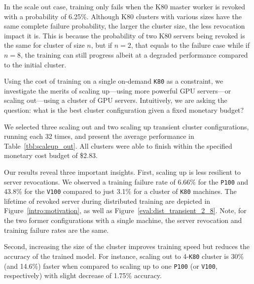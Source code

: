 \begin{table}[t]
{%
In the scale out case, training only fails when the K80 master worker is revoked with a probability of 6.25\%. Although K80 clusters with various sizes have the same complete failure probability, the larger the cluster size, the less revocation impact it is. This is because the probability of two K80 servers being revoked is the same for cluster of size $n$, but if $n=2$, that equals to the failure case while if $n=8$, the training can still progress albeit at a degraded performance compared to the initial cluster.}
\label{tbl:scaleup_out}
\end{table}


Using the cost of training on a single on-demand \texttt{K80} as a
constraint, we investigate the merits of 
scaling up---using more powerful GPU servers---or scaling out---using a cluster of GPU servers.
Intuitively, we are asking the question: what is the best
cluster configuration given a fixed monetary budget?

We selected three scaling out and two scaling up transient cluster configurations,
running each 32 times, and present the average performance in
Table~\ref{tbl:scaleup_out}. All clusters were able to finish within the
specified monetary cost budget of \$2.83.  


Our results reveal three important insights. First, scaling up is less
resilient to server revocations. We observed a training failure rate of 6.66\%
for the \texttt{P100} and 43.8\% for the \texttt{V100} compared to just 3.1\% for
a cluster of \texttt{K80} machines. The lifetime of revoked server during distributed
training are depicted in Figure~\ref{intro:motivation}, as well as Figure~\ref{eval:dist_transient_2_8}. 
Note, for the two former configurations with a single machine, the server revocation and training failure rates are the
same. 

Second, increasing the size of the cluster
improves training speed but reduces the accuracy of the trained model. For
instance, scaling out to 4-\texttt{K80} cluster is 30\% (and 14.6\%) faster
when compared to scaling up to one \texttt{P100} (or \texttt{V100},
respectively) with slight decrease of 1.75\% accuracy.  

